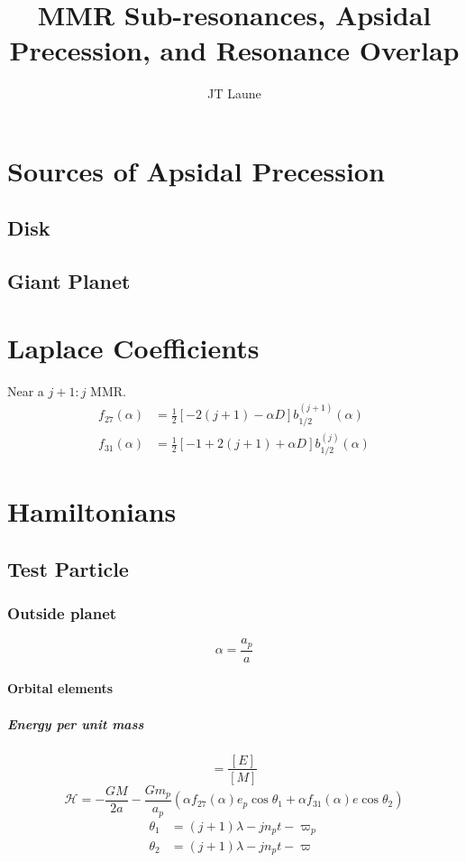 \documentclass{article}
\title{MMR Sub-resonances, Apsidal Precession, and Resonance Overlap}
\author{JT Laune}
\begin{document}
\maketitle

\section{Sources of Apsidal Precession}
\subsection{Disk}
\subsection{Giant Planet}
\section{Laplace Coefficients}
Near a $j+1:j$ MMR.
\begin{align}
    f_{27}(\alpha) &= \frac12[-2(j+1)-\alpha D]b_{1/2}^{(j+1)}(\alpha) \\
    f_{31}(\alpha) &= \frac12[-1+2(j+1)+\alpha D]b_{1/2}^{(j)}(\alpha)
\end{align}

\section{Hamiltonians}
\subsection{Test Particle}
\subsubsection{Outside planet}
\begin{equation}
    \alpha = \frac{a_p}{a}
\end{equation}

\paragraph{Orbital elements}
\subparagraph{Energy per unit mass}
\begin{equation}
    [\mathcal H] = \frac{[E]}{[M]}
\end{equation}
\begin{equation}
    \mathcal H = -\frac{GM}{2a}
    - \frac{Gm_p}{a_p}(\alpha f_{27}(\alpha)e_p\cos\theta_1
    +\alpha f_{31}(\alpha)e\cos\theta_2)
\end{equation}
\begin{align}
    \theta_1 & = (j+1)\lambda-jn_pt -\varpi_p \\
    \theta_2 & = (j+1)\lambda-jn_pt -\varpi
\end{align}
\end{document}

